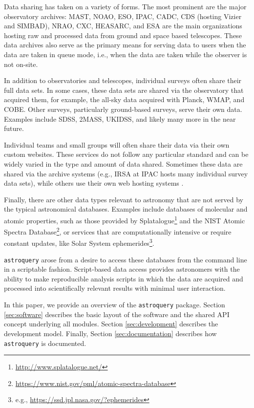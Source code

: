\documentclass[twocolumn]{aastex62}
\newcommand{\package}[1]{\texttt{#1}\xspace}
\newcommand{\astroquery}{\package{astroquery}}
\begin{document}
Data sharing has taken on a variety of forms.  The most prominent are the major
observatory archives: MAST, NOAO, ESO, IPAC, CADC, CDS (hosting Vizier and
SIMBAD), NRAO, CXC, HEASARC, and ESA are the main
organizations hosting raw and processed data from ground and space based
telescopes.  These data archives also serve as the primary means for serving data
to users when the data are taken in queue mode, i.e., when the data are taken
while the observer is not on-site.

In addition to observatories and telescopes, individual surveys often share
their full data sets.  In some cases, these data sets are shared via the
observatory that acquired them, for example, the all-sky data acquired with
Planck, WMAP, and COBE\@.  Other surveys, particularly ground-based surveys,
serve their own data.  Examples include SDSS, 2MASS, UKIDSS, and likely many
more in the near future.

Individual teams and small groups will often share their data via their own
custom websites.  These services do not follow any particular standard and can
be widely varied in the type and amount of data shared.  Sometimes these data
are shared via the archive systems (e.g., IRSA at IPAC hosts many individual
survey data sets), while others use their own web hosting systems \citep[e.g.,
MAGPIS;][]{Helfand2006}.

Finally, there are other data types relevant to astronomy that are not served
by the typical astronomical databases.  Examples include databases of molecular
and atomic properties, such as those provided by
Splatalogue\footnote{\url{http://www.splatalogue.net/}} and the NIST Atomic
Spectra
Database\footnote{\url{https://www.nist.gov/pml/atomic-spectra-database}}, or
services that are computationally intensive or require constant updates, like
Solar System ephemerides\footnote{e.g.,
\url{https://ssd.jpl.nasa.gov/?ephemerides}}.  

\astroquery arose from a desire to access these databases from the command line
in a scriptable fashion.  Script-based data access provides astronomers with
the ability to make reproducible analysis scripts in which the data are
acquired and processed into scientifically relevant results with minimal
user interaction.

In this paper, we provide an overview of the \astroquery package.  Section
\ref{sec:software} describes the basic layout of the software and the shared
API concept underlying all modules.  Section \ref{sec:development} describes
the development model.  Finally, Section \ref{sec:documentation} describes how
\astroquery is documented.
\end{document}
